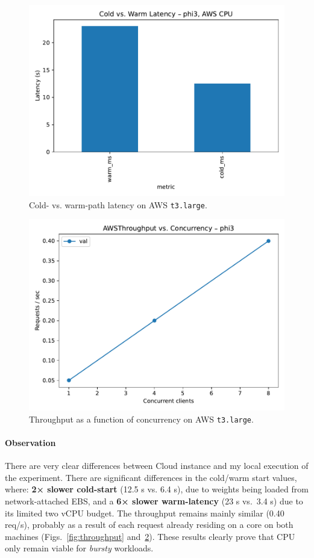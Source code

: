 \documentclass[conference]{IEEEtran}
\begin{document}
\begin{figure}[t]
  \centering
  \includegraphics[width=\linewidth]{AWSlatency_cold_warm} 
  \caption{Cold- vs. warm-path latency on AWS \texttt{t3.large}.}
  \label{fig:aws_latency}
\end{figure}

\begin{figure}[t]
  \centering
  \includegraphics[width=\linewidth]{AWSthroughput_vs_c}    
  \caption{Throughput as a function of concurrency on AWS \texttt{t3.large}.}
  \label{fig:aws_thr}
\end{figure}

\paragraph*{Observation}
There are very clear differences between Cloud instance and my local execution of the experiment. There are significant differences in the cold/warm start values, where: \textbf{2× slower cold-start}
(12.5 s vs. 6.4 s), due to weights being loaded from network-attached EBS, and a
\textbf{6× slower warm-latency} (23 s vs.\ 3.4 s) due to its limited two vCPU budget. The throughput remains mainly similar (0.40 req/s), probably as a result of each request already residing on a core on both machines (Figs.~\ref{fig:throughput}
and~\ref{fig:aws_thr}). These results clearly prove that CPU only remain viable for \emph{bursty} workloads. 
\end{document}
